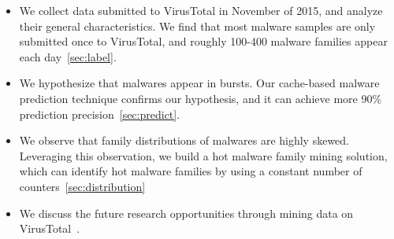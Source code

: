 \begin{itemize}

\item We collect data submitted to VirusTotal in November of 2015, 
and analyze their general characteristics. 
We find that most malware samples are only submitted once to VirusTotal, 
and roughly 100-400 malware families appear each day~\ref{sec:label}. 

\item We hypothesize that malwares appear in bursts. 
Our cache-based malware prediction technique confirms our hypothesis, 
and it can achieve more 90\% prediction precision~\ref{sec:predict}. 

\item We observe that family distributions of malwares are highly skewed. 
Leveraging this observation, we build a hot malware family mining solution, 
which can identify hot malware families by using a constant number of counters~\ref{sec:distribution}

\item We discuss the future research opportunities through mining data on VirusTotal~\label{sec:oppo}. 

\end{itemize}


